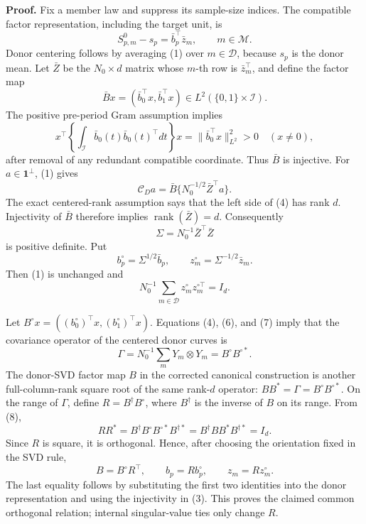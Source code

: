 \textbf{Proof.}
Fix a member law and suppress its sample-size indices.  The compatible factor
representation, including the target unit, is
\[
 S^0_{p,m}-s_p=\bar b_p^\top\bar z_m,
 \qquad m\in\mathcal M.                                    \tag{1}
\]
Donor centering follows by averaging (1) over \(m\in\mathcal D\), because
\(s_p\) is the donor mean.  Let \(\bar Z\) be the \(N_0\times d\) matrix
whose \(m\)-th row is \(\bar z_m^\top\), and define the factor map
\[
 \bar Bx=(\bar b_0^\top x,\bar b_1^\top x)
 \in L^2(\{0,1\}\times\mathcal I).                         \tag{2}
\]
The positive pre-period Gram assumption implies
\[
 x^\top\!\left\{\int_{\mathcal I}\bar b_0(t)\bar b_0(t)^\top dt\right\}x
 =\|\bar b_0^\top x\|_{L^2}^2>0
 \quad(x\ne0),                                             \tag{3}
\]
after removal of any redundant compatible coordinate.  Thus \(\bar B\) is
injective.  For \(a\in\mathbf 1^\perp\), (1) gives
\[
 \mathcal C_Da=\bar B\{N_0^{-1/2}\bar Z^\top a\}.          \tag{4}
\]
The exact centered-rank assumption says that the left side of (4) has rank
\(d\).  Injectivity of \(\bar B\) therefore implies
\(\operatorname{rank}(\bar Z)=d\).  Consequently
\[
 \Sigma=N_0^{-1}\bar Z^\top\bar Z                         \tag{5}
\]
is positive definite.  Put
\[
 b_p^\circ=\Sigma^{1/2}\bar b_p,
 \qquad
 z_m^\circ=\Sigma^{-1/2}\bar z_m.                          \tag{6}
\]
Then (1) is unchanged and
\[
 N_0^{-1}\sum_{m\in\mathcal D}z_m^\circ z_m^{\circ\top}=I_d.
                                                                    \tag{7}
\]

Let \(B^\circ x=((b_0^\circ)^\top x,(b_1^\circ)^\top x)\).
Equations (4), (6), and (7) imply that the covariance operator of the
centered donor curves is
\[
 \Gamma=N_0^{-1}\sum_mY_m\otimes Y_m=B^\circ B^{\circ *}. \tag{8}
\]
The donor-SVD factor map \(B\) in the corrected canonical construction is
another full-column-rank square root of the same rank-\(d\) operator:
\(BB^*=\Gamma=B^\circ B^{\circ *}\).  On the range of \(\Gamma\), define
\(R=B^{\dagger}B^\circ\), where \(B^{\dagger}\) is the inverse of \(B\)
on its range.  From (8),
\[
 RR^*=B^{\dagger}B^\circ B^{\circ *}B^{\dagger *}
      =B^{\dagger}BB^*B^{\dagger *}=I_d.                  \tag{9}
\]
Since \(R\) is square, it is orthogonal.  Hence, after choosing the
orientation fixed in the SVD rule,
\[
 B=B^\circ R^\top,
 \qquad
 b_p=R b_p^\circ,
 \qquad
 z_m=Rz_m^\circ.                                           \tag{10}
\]
The last equality follows by substituting the first two identities into
the donor representation and using the injectivity in (3).  This proves
the claimed common orthogonal relation; internal singular-value ties only
change \(R\).


